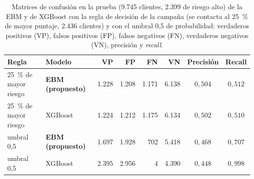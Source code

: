 \begin{table}[tbp]
  \centering\small\setlength{\tabcolsep}{3pt}
  \caption{Matrices de confusión en la prueba (9.745 clientes, 2.399 de riesgo alto) de la EBM y de XGBoost con la regla de decisión de la campaña (se contacta al 25~\% de mayor puntaje, 2.436 clientes) y con el umbral 0,5 de probabilidad: verdaderos positivos (VP), falsos positivos (FP), falsos negativos (FN), verdaderos negativos (VN), precisión y \emph{recall}.}
  \label{tab:confusion}
  \begin{tabular}{@{}l l r r r r c c@{}}
    \toprule
    Regla & Modelo & VP & FP & FN & VN & Precisión & Recall \\
    \midrule
    25~\% de mayor riesgo & \textbf{EBM (propuesto)} & 1.228 & 1.208 & 1.171 & 6.138 & $0{,}504$ & $0{,}512$ \\
    25~\% de mayor riesgo & XGBoost & 1.224 & 1.212 & 1.175 & 6.134 & $0{,}502$ & $0{,}510$ \\
    \midrule
    umbral 0,5 & \textbf{EBM (propuesto)} & 1.697 & 1.928 & 702 & 5.418 & $0{,}468$ & $0{,}707$ \\
    umbral 0,5 & XGBoost & 2.395 & 2.956 & 4 & 4.390 & $0{,}448$ & $0{,}998$ \\
    \bottomrule
  \end{tabular}
\end{table}
